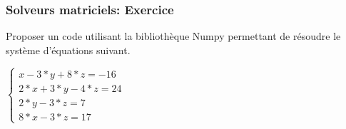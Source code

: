 \begin{frame}[fragile]
\frametitle{Solveurs matriciels: Exercice}
Proposer un code utilisant la bibliothèque Numpy permettant de résoudre le système d'équations suivant.

\begin{flushleft}
$\left\{\begin{array}{l}
x-3*y+8*z=-16 \\ 2*x+3*y-4*z=24 \\ 2*y-3*z=7 \\ 8*x-3*z=17
\end{array}\right.$
\end{flushleft}
\vspace{3cm}
\end{frame}


